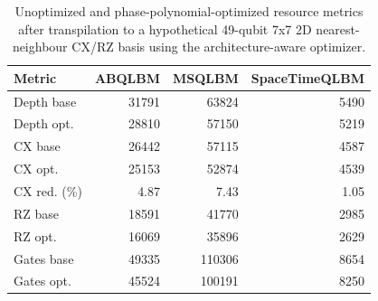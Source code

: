 \begin{table}[ht]
\centering
\begin{tabular}{lrrr}
\hline
Metric & ABQLBM & MSQLBM & SpaceTimeQLBM \\
\hline
Depth base & 31791 & 63824 & 5490 \\
Depth opt. & 28810 & 57150 & 5219 \\
CX base & 26442 & 57115 & 4587 \\
CX opt. & 25153 & 52874 & 4539 \\
CX red. (\%) & 4.87 & 7.43 & 1.05 \\
RZ base & 18591 & 41770 & 2985 \\
RZ opt. & 16069 & 35896 & 2629 \\
Gates base & 49335 & 110306 & 8654 \\
Gates opt. & 45524 & 100191 & 8250 \\
\hline
\end{tabular}
\caption{Unoptimized and phase-polynomial-optimized resource metrics after transpilation to a hypothetical 49-qubit 7x7 2D nearest-neighbour CX/RZ basis using the architecture-aware optimizer.}
\label{tab:phase-poly-optimization-comparison-2d-grid}
\end{table}
